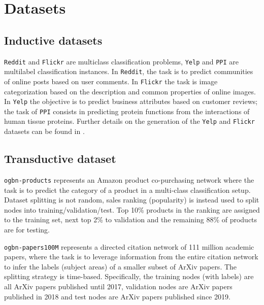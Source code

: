 \documentclass{article}
\begin{document}





\newpage
\appendix

\section{Datasets}

\subsection{Inductive datasets}

\texttt{Reddit} \cite{GraphSAGE} and \texttt{Flickr} \cite{DBLP:journals/corr/abs-1907-04931} are multiclass classification problems, \texttt{Yelp} \cite{DBLP:journals/corr/abs-1907-04931} and \texttt{PPI} \cite{Zitnik_2017} are multilabel classification instances. In \texttt{Reddit}, the task is to predict communities of online posts based on user comments. In \texttt{Flickr} the task is image categorization based on the description and common properties of online images. In \texttt{Yelp} the objective is to predict business attributes based on customer reviews; the task of \texttt{PPI} consists in predicting protein functions from the interactions of human tissue proteins. Further details on the generation of the \texttt{Yelp} and \texttt{Flickr} datasets can be found in \cite{DBLP:journals/corr/abs-1907-04931}.

\subsection{Transductive dataset}

\texttt{ogbn-products} \cite{ogb2020} represents an Amazon product co-purchasing network \cite{Bhatia16} where the task is to predict the category of a product in a multi-class classification setup. Dataset splitting is not random, sales ranking (popularity) is instead used to split nodes into training/validation/test. Top 10\% products in the ranking are assigned to the training set, next top 2\% to validation and the remaining 88\% of products are for testing.

\texttt{ogbn-papers100M} \cite{ogb2020} represents a directed citation network of  111 million academic papers, where the task is to leverage information from the entire citation network to infer the labels (subject areas) of a smaller subset of ArXiv papers. The splitting strategy is time-based. Specifically, the training nodes (with labels) are all ArXiv papers published until 2017, validation nodes are ArXiv papers published in 2018 and test nodes are ArXiv papers published since 2019.
\end{document}
